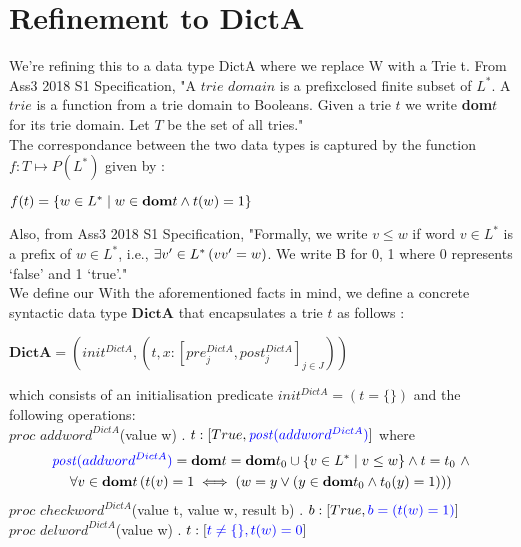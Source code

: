 \documentclass[a4paper,12pt,fleqn]{scrartcl}
\newcommand{\post}{\mathit{post}}
\newcommand{\DictA}{\mathbf{DictA}}
\newcommand{\domt}{\mathbf{dom}t}
\newcommand{\domto}{\mathbf{dom}t_{0}}
\begin{document}
\section{Refinement to DictA}
\label{sec:task-2}
We’re refining this to a data type DictA where we replace W with a Trie t. From Ass3 2018 S1 Specification, "A $trie$ $domain$ is a prefixclosed finite subset of $L^*$. A $trie$ is a function from a trie domain to Booleans. Given a trie $t$ we write \textbf{dom}$t$ for its trie domain. Let $T$ be the set of all tries."\\ 
The correspondance between the two data types is captured by the function $f : T \mapsto P(L^*)$ given by :
\begin{center}$f(t) = \{w\in L^* \mid w \in \textbf{dom}t \wedge t(w)=1\}$\end{center}
Also, from Ass3 2018 S1 Specification, "Formally, we write $v\leq w$ if word $v\in L^*$ is a prefix of $w\in L^*$, i.e., $\exists v'\in L^*\left(vv' = w\right)$. We write B for {0, 1} where 0 represents ‘false’ and 1 ‘true’."\\
We define our 
With the aforementioned facts in mind, we define a concrete syntactic data type $\DictA$ that encapsulates a trie $t$ as follows :
\begin{center}$\DictA = (init^{DictA} , (t,x : [pre_{j}^{DictA}, post_{j}^{DictA}]_{j\in J}))$\end{center}
which consists of an  initialisation predicate \color{blue}$init^{DictA} = (t = \{ \})$ \color{black} and the following operations:\\
$proc$ $addword^{DictA}$(value w) . $t : [True, \color{blue}\post(addword^{DictA})\color{black}]$ where
\begin{gather*}
\color{blue}\post(addword^{DictA})\color{black} = \domt = \domto \cup \{v\in L^* \mid v\leq w\} \And t = t_{0}\text{ }\And \\
\All{v\in \domt}{t(v) = 1 \iff (w=y \Or (y\in \domto \And t_0(y) = 1))}
\end{gather*}
$proc$ $checkword^{DictA}$(value t, value w, result b) . $b : [True, \color{blue}b = (t(w) = 1)\color{black}]$\\
$proc$ $delword^{DictA}$(value w) . $t : [\color{blue}t\neq \{ \}, t(w) = 0\color{black}]$\\
\end{document}
